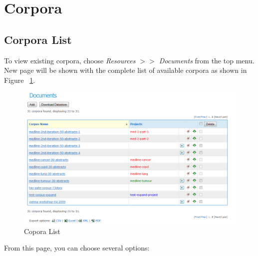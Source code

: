 \section{Corpora}

\subsection{Corpora List}\label{section:corpora-list}
To view existing corpora, choose \emph{Resources $>>$ Documents} from the top
menu. New page will be shown with the complete list of available corpora as
shown in Figure ~\ref{fig:corporalist}.
\begin{figure}[htb]
\centering
\includegraphics[scale=0.4]{corporalist}
\caption{Copora List}
\label{fig:corporalist}
\end{figure}
From this page, you can choose several
options:
